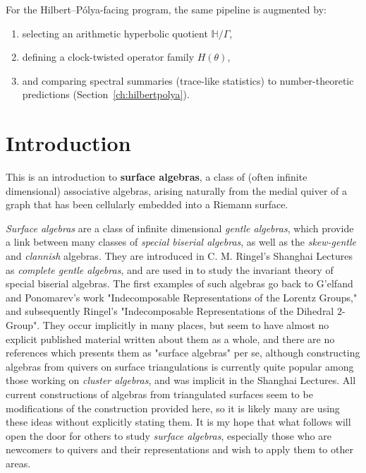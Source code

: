 \documentclass[11pt,oneside]{amsbook}
\numberwithin{equation}{section}
\theoremstyle{plain}
\theoremstyle{definition}
\theoremstyle{remark}
\newcommand{\HH}{\mathbb{H}}
\begin{document}
For the Hilbert--Pólya-facing program, the same pipeline is augmented by:
\begin{enumerate}
\item selecting an arithmetic hyperbolic quotient $\HH/\Gamma$,
\item defining a clock-twisted operator family $H(\theta)$,
\item and comparing spectral summaries (trace-like statistics) to number-theoretic predictions (Section~\ref{ch:hilbertpolya}).
\end{enumerate}
\clearpage

\chapter{Introduction} %
	This is an introduction to \textbf{surface algebras}, a class of (often infinite dimensional) associative algebras, arising naturally from the medial quiver of a graph that has been cellularly embedded into a Riemann surface.

	\textit{Surface algebras} are a class of infinite dimensional \textit{gentle algebras}, which provide a link between many classes of \textit{special biserial algebras}, as well as the \textit{skew-gentle} and \textit{clannish} algebras. They are introduced in C. M. Ringel's Shanghai Lectures  as \textit{complete gentle algebras}, and are used in \cite{CCKW1} to study the invariant theory of special biserial algebras. The first examples of such algebras go back to G'elfand and Ponomarev's work "Indecomposable Representations of the Lorentz Groups," and subsequently Ringel's "Indecomposable Representations of the Dihedral $2$-Group". They occur implicitly in many places, but seem to have almost no explicit published material written about them as a whole, and there are no references which presents them as "surface algebras" per se, although constructing algebras from quivers on surface triangulations is currently quite popular among those working on \textit{cluster algebras}, and was implicit in the Shanghai Lectures. All current constructions of algebras from triangulated surfaces seem to be modifications of the construction provided here, so it is likely many are using these ideas without explicitly stating them. It is my hope that what follows will open the door for others to study \textit{surface algebras}, especially those who are newcomers to quivers and their representations and wish to apply them to other areas. 
	
\end{document}
